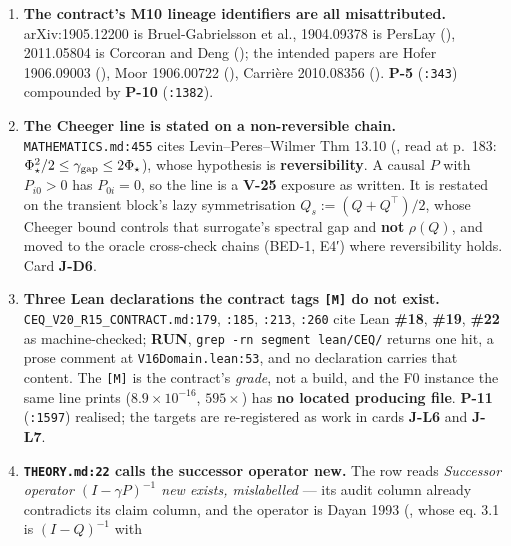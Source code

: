 \documentclass[11pt,a4paper]{article}
\theoremstyle{plain}
\theoremstyle{definition}
\theoremstyle{remark}
\providecommand{\tightlist}{%
  \setlength{\itemsep}{0pt}\setlength{\parskip}{0pt}}
\begin{document}
\begin{enumerate}
\def\labelenumi{\arabic{enumi}.}
\tightlist
\item
  \textbf{The contract's M10 lineage identifiers are all misattributed.}
  arXiv:1905.12200 is Bruel-Gabrielsson et al., 1904.09378 is PersLay
  (\citep{carriere-2019-perslay}), 2011.05804 is Corcoran and Deng
  (\citep{corcoran-2020-ph-gradient-regularization}); the intended
  papers are Hofer 1906.09003
  (\citep{hofer-2019-connectivity-optimized}), Moor 1906.00722
  (\citep{moor-2020-topological-autoencoders}), Carrière 2010.08356
  (\citep{carriere-2021-optimizing-ph}). \textbf{P-5} (\texttt{:343})
  compounded by \textbf{P-10} (\texttt{:1382}).
\item
  \textbf{The Cheeger line is stated on a non-reversible chain.}
  \texttt{MATHEMATICS.md:455} cites Levin--Peres--Wilmer Thm 13.10
  (\citep{levin-2017-markov-mixing}, read at p.~183:
  \(\Phi_\star^{2}/2\le\gamma_{\rm gap}\le 2\Phi_\star\)), whose
  hypothesis is \textbf{reversibility}. A causal \(P\) with \(P_{i0}>0\)
  has \(P_{0i}=0\), so the line is a \textbf{V-25} exposure as written.
  It is restated on the transient block's lazy symmetrisation
  \(Q_s:=(Q+Q^{\top})/2\), whose Cheeger bound controls that surrogate's
  spectral gap and \textbf{not} \(\rho(Q)\), and moved to the oracle
  cross-check chains (BED-1, E4′) where reversibility holds. Card
  \textbf{J-D6}.
\item
  \textbf{Three Lean declarations the contract tags \texttt{{[}M{]}} do
  not exist.} \texttt{CEQ\_V20\_R15\_CONTRACT.md:179}, \texttt{:185},
  \texttt{:213}, \texttt{:260} cite Lean \textbf{\#18}, \textbf{\#19},
  \textbf{\#22} as machine-checked; \textbf{RUN},
  \texttt{grep\ -rn\ \textquotesingle{}segment\textquotesingle{}\ lean/CEQ/}
  returns one hit, a prose comment at \texttt{V16Domain.lean:53}, and no
  declaration carries that content. The \texttt{{[}M{]}} is the
  contract's \emph{grade}, not a build, and the F0 instance the same
  line prints (\(8.9\times10^{-16}\), \(595\times\)) has \textbf{no
  located producing file}. \textbf{P-11} (\texttt{:1597}) realised; the
  targets are re-registered as work in cards \textbf{J-L6} and
  \textbf{J-L7}.
\item
  \textbf{\texttt{THEORY.md:22} calls the successor operator new.} The
  row reads \emph{Successor operator \((I-\gamma P)^{-1}\) \textbar{}
  new \textbar{} exists, mislabelled} --- its audit column already
  contradicts its claim column, and the operator is Dayan 1993
  (\citep{dayan-1993-successor}, whose eq. 3.1 is \((I-Q)^{-1}\) with

\end{enumerate}
\end{document}
